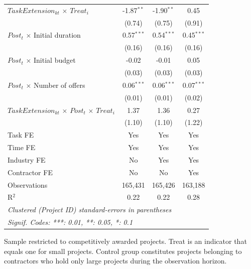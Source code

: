\documentclass[
]{article}
\begin{document}
\begin{table}[htbp]
\begin{tabular}{lccc}
      $TaskExtension_{kt}$ $\times$ $Treat_i$                     & -1.87$^{**}$  & -1.90$^{**}$  & 0.45\\   
                                                                  & (0.74)        & (0.75)        & (0.91)\\   
      $Post_t$ $\times$ Initial duration                          & 0.57$^{***}$  & 0.54$^{***}$  & 0.45$^{***}$\\   
                                                                  & (0.16)        & (0.16)        & (0.16)\\   
      $Post_t$ $\times$ Initial budget                            & -0.02         & -0.01         & 0.05\\   
                                                                  & (0.03)        & (0.03)        & (0.03)\\   
      $Post_t$ $\times$ Number of offers                          & 0.06$^{***}$  & 0.06$^{***}$  & 0.07$^{***}$\\   
                                                                  & (0.01)        & (0.01)        & (0.02)\\   
      $TaskExtension_{kt}$ $\times$ $Post_t$ $\times$ $Treat_i$   & 1.37          & 1.36          & 0.27\\   
                                                                  & (1.10)        & (1.10)        & (1.22)\\   
      \midrule 
      Task FE                                                     & Yes           & Yes           & Yes\\  
      Time FE                                                     & Yes           & Yes           & Yes\\  
      Industry FE                                                 & No            & Yes           & Yes\\  
      Contractor FE                                               & No            & No            & Yes\\  
      Observations                                                & 165,431       & 165,426       & 163,188\\  
      R$^2$                                                       & 0.22          & 0.22          & 0.28\\  
      \midrule
      \multicolumn{4}{l}{\emph{Clustered (Project ID) standard-errors in parentheses}}\\
      \multicolumn{4}{l}{\emph{Signif. Codes: ***: 0.01, **: 0.05, *: 0.1}}\\
   \end{tabular}
   
   \par \raggedright 
   Sample restricted to competitively awarded projects. Treat is an indicator that equals one for small projects. Control group constitutes projects belonging to contractors who hold only large projects during the observation horizon.
\end{table}
\end{document}
